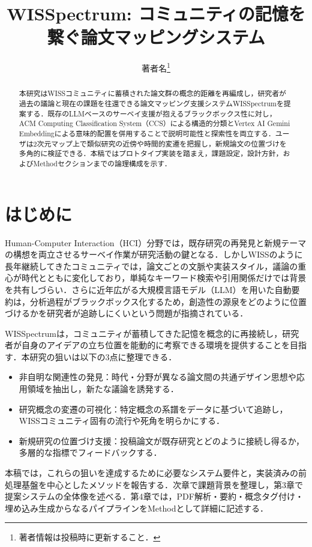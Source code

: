 \documentclass[twoside]{wiss}
\begin{document}
\title{WISSpectrum: コミュニティの記憶を繋ぐ論文マッピングシステム}
\etitle{}
\author{著者名\thanks{著者情報は投稿時に更新すること．}}

\begin{abstract}
本研究はWISSコミュニティに蓄積された論文群の概念的距離を再編成し，研究者が過去の議論と現在の課題を往還できる論文マッピング支援システムWISSpectrumを提案する．既存のLLMベースのサーベイ支援が抱えるブラックボックス性に対し，ACM Computing Classification System（CCS）による構造的分類とVertex AI Gemini Embeddingによる意味的配置を併用することで説明可能性と探索性を両立する．ユーザは2次元マップ上で類似研究の近傍や時間的変遷を把握し，新規論文の位置づけを多角的に検証できる．本稿ではプロトタイプ実装を踏まえ，課題設定，設計方針，およびMethodセクションまでの論理構成を示す．
\end{abstract}

\maketitle

\section{はじめに}
Human-Computer Interaction（HCI）分野では，既存研究の再発見と新規テーマの構想を両立させるサーベイ作業が研究活動の鍵となる．しかしWISSのように長年継続してきたコミュニティでは，論文ごとの文脈や実装スタイル，議論の重心が時代とともに変化しており，単純なキーワード検索や引用関係だけでは背景を共有しづらい．さらに近年広がる大規模言語モデル（LLM）を用いた自動要約は，分析過程がブラックボックス化するため，創造性の源泉をどのように位置づけるかを研究者が追跡しにくいという問題が指摘されている．

WISSpectrumは，コミュニティが蓄積してきた記憶を概念的に再接続し，研究者が自身のアイデアの立ち位置を能動的に考察できる環境を提供することを目指す．本研究の狙いは以下の3点に整理できる．
\begin{itemize}
 \item 非自明な関連性の発見：時代・分野が異なる論文間の共通デザイン思想や応用領域を抽出し，新たな議論を誘発する．
 \item 研究概念の変遷の可視化：特定概念の系譜をデータに基づいて追跡し，WISSコミュニティ固有の流行や死角を明らかにする．
 \item 新規研究の位置づけ支援：投稿論文が既存研究とどのように接続し得るか，多層的な指標でフィードバックする．
\end{itemize}
本稿では，これらの狙いを達成するために必要なシステム要件と，実装済みの前処理基盤を中心としたメソッドを報告する．次章で課題背景を整理し，第3章で提案システムの全体像を述べる．第4章では，PDF解析・要約・概念タグ付け・埋め込み生成からなるパイプラインをMethodとして詳細に記述する．
\end{document}
